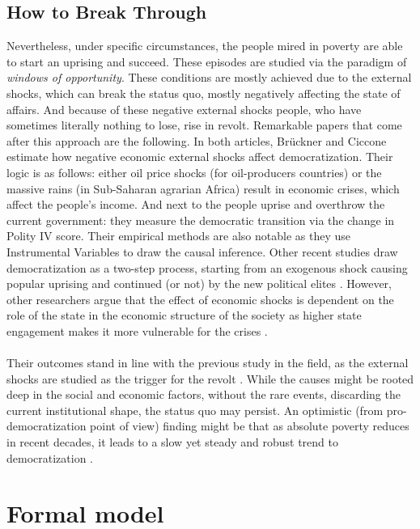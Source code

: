 \documentclass[a4paper, 12pt]{article}
\begin{document}
	\subsection{How to Break Through}
	
	Nevertheless, under specific circumstances, the people mired in poverty are able to start an uprising and succeed. These episodes are studied via the paradigm of \textit{windows of opportunity}. These conditions are mostly achieved due to the external shocks, which can break the status quo, mostly negatively affecting the state of affairs. And because of these negative external shocks people, who have sometimes literally nothing to lose, rise in revolt. Remarkable papers that come after this approach are the following. In both articles, Brückner and Ciccone \parencite{oil_dem, rain_dem} estimate how negative economic external shocks affect democratization. Their logic is as follows: either oil price shocks (for oil-producers countries) or the massive rains (in Sub-Saharan agrarian Africa) result in economic crises, which affect the people's income. And next to the people uprise and overthrow the current government: they measure the democratic transition via the change in Polity IV score. Their empirical methods are also notable as they use Instrumental Variables to draw the causal inference. Other recent studies draw democratization as a two-step process, starting from an exogenous shock causing popular uprising and continued (or not) by the new political elites \parencite{shockdemoc}. However, other researchers argue that the effect of economic shocks is dependent on the role of the state in the economic structure of the society as higher state engagement makes it more vulnerable for the crises \parencite{crisisdemoc}.
    \\\\
	Their outcomes stand in line with the previous study in the field, as the external shocks are studied as the trigger for the revolt \parencite{social_origins, econ_origins}. While the causes might be rooted deep in the social and economic factors, without the rare events, discarding the current institutional shape, the status quo may persist. An optimistic (from pro-democratization point of view) finding might be that as absolute poverty reduces in recent decades, it leads to a slow yet steady and robust trend to democratization \parencite{poverty_democratization}.  
	
	\section{Formal model}
	
\end{document}
